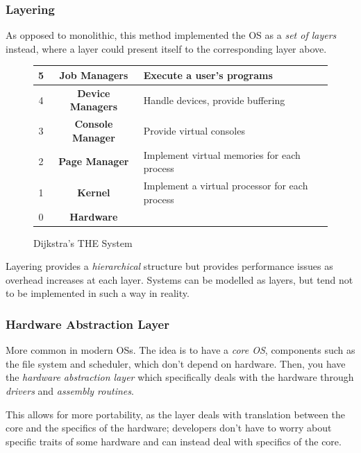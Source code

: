 \documentclass{article}
\begin{document}
\subsubsection{Layering}

As opposed to monolithic, this method implemented the OS as a \textit{set of layers} instead, where a layer could present itself to the corresponding layer above.

\begin{figure}[H]
  \centering
  \begin{center}
    \begin{tabular}{|c|c|l|}
      \hline
      5 & \textbf{Job Managers} & Execute a user's programs\\
      \hline
      4 & \textbf{Device Managers} & Handle devices, provide buffering\\
      \hline
      3 & \textbf{Console Manager} & Provide virtual consoles\\
      \hline
      2 & \textbf{Page Manager} & Implement virtual memories for each process\\
      \hline
      1 & \textbf{Kernel} & Implement a virtual processor for each process\\
      \hline
      0 & \textbf{Hardware} & \\
      \hline
    \end{tabular}
  \end{center}
  \caption{Dijkstra's THE System}
\end{figure}

Layering provides a \textit{hierarchical} structure but provides performance issues as overhead increases at each layer. Systems can be modelled as layers, but tend not to be implemented in such a way in reality.

\subsubsection{Hardware Abstraction Layer}

More common in modern OSs. The idea is to have a \textit{core OS}, components such as the file system and scheduler, which don't depend on hardware. Then, you have the \textit{hardware abstraction layer} which specifically deals with the hardware through \textit{drivers} and \textit{assembly routines}.

This allows for more portability, as the layer deals with translation between the core and the specifics of the hardware; developers don't have to worry about specific traits of some hardware and can instead deal with specifics of the core.
\end{document}
